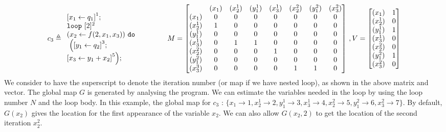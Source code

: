 \documentclass[a4paper,11pt]{article}
\begin{document}
\[c_3 \triangleq
\begin{array}{l}
     \left[x_1 \leftarrow q_1 \right]^1 ; \\
    \eloop ~ [2]^{2} ~\\
    ( 
 x_2 \leftarrow f( 2 , x_1 , x_3) )
     ~ \edo
    \\
    ~ \Big( 
    \left[y_1 \leftarrow q_2 \right]^3; \\
    \left[x_3 \leftarrow y_1  + x_2 \right]^5
    \Big) ;
\end{array}
~~~~~~~~~~~~
M =  \left[ \begin{matrix}
 & (x_1) & (x_2^{1}) & (y_1^{1}) & (x_3^{1})  & (x_2^{2}) & (y_1^{2}) & (x_3^{2}) \\
(x_1) & 0 & 0 & 0 & 0 & 0 & 0 & 0\\
(x_2^{1}) & 1 & 0 & 0 & 0 & 0 & 0 & 0\\
(y_1^{1}) & 0 & 0 & 0 & 0 & 0 & 0& 0 \\
(x_3^{1}) & 0 & 1 & 1 & 0 & 0 & 0 & 0\\
(x_2^{2}) & 0 & 0 & 0 & 1 & 0 & 0 & 0\\
(y_1^{2}) & 0 & 0 & 0 & 0 & 0 & 0 & 0\\
(x_3^{3}) & 0 & 0 & 0 & 0 & 1 & 1 & 0\\
\end{matrix} \right] ~ , V = \left [ \begin{matrix}
(x_1) &  1 \\
(x_2^{1}) & 0 \\
(y_1^{1}) & 1 \\
(x_3^{1}) &  0 \\
(x_2^{2}) & 0 \\
(y_1^{2}) & 1 \\
(x_3^{2}) &  0 \\
\end{matrix} \right ]
\]
We consider to have the superscript to denote the iteration number (or map if we have nested loop), as shown in the above matrix and vector. The global map $G$ is generated by analysing the program. We can estimate the variables needed in the loop by using the loop number $N$ and the loop body. In this example, the global map for $c_3$ : $ \{ x_1 \to 1, x_2^{1} \to 2, y_1^{1} \to 3 , x_3^{1} \to 4 , x_2^{2} \to 5 , y_1^{2} \to 6 , x_3^{2} \to 7  \} $.  
By default, $G(x_2)$ gives the location for the first appearance of the variable $x_2$. We can also allow $G(x_2 , 2)$ to get the location of the second iteration $x_2^{2}$. 
\end{document}

